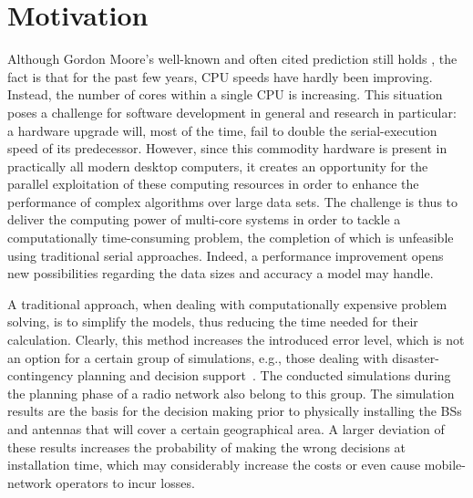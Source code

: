 \section{Motivation \label{sec:04-Motivation}}

Although Gordon Moore's well-known and often cited prediction still
holds \cite{Moore_Cramming_more_components_onto_integrated_circuits:1998},
the fact is that for the past few years, CPU speeds have hardly been
improving. Instead, the number of cores within a single CPU is increasing.
This situation poses a challenge for software development in general
and research in particular: a hardware upgrade will, most of the time,
fail to double the serial-execution speed of its predecessor. However,
since this commodity hardware is present in practically all modern
desktop computers, it creates an opportunity for the parallel exploitation
of these computing resources in order to enhance the performance of
complex algorithms over large data sets. The challenge is thus to
deliver the computing power of multi-core systems in order to tackle
a computationally time-consuming problem, the completion of which
is unfeasible using traditional serial approaches. Indeed, a performance
improvement opens new possibilities regarding the data sizes and accuracy
a model may handle.

A traditional approach, when dealing with computationally expensive
problem solving, is to simplify the models, thus reducing the time
needed for their calculation. Clearly, this method increases the introduced
error level, which is not an option for a certain group of simulations,
e.g., those dealing with disaster-contingency planning and decision
support~\cite{Huang_Using_adaptively_coupled_models_and_high_performance_computing_for_enabling_the_computability_of_dust_storm_forecasting:2012,Yin_A_framework_for_integrating_GIS_and_parallel_computing_for_spatial_control_problems_a_case_study_of_wildfire_dontrol:2012}.
The conducted simulations during the planning phase of a radio network
also belong to this group. The simulation results are the basis for
the decision making prior to physically installing the BSs and antennas
that will cover a certain geographical area. A larger deviation of
these results increases the probability of making the wrong decisions
at installation time, which may considerably increase the costs or
even cause mobile-network operators to incur losses.

